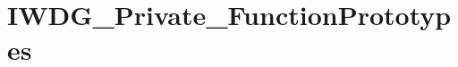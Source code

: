 \hypertarget{group___i_w_d_g___private___function_prototypes}{}\section{I\+W\+D\+G\+\_\+\+Private\+\_\+\+Function\+Prototypes}
\label{group___i_w_d_g___private___function_prototypes}
